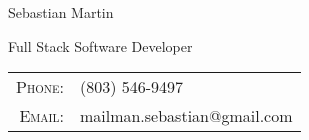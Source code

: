 \documentclass[letterpaper,10pt]{article}
\begin{document}
\pagestyle{empty} %

\par{\centering
{\fontsize{40}{0}\selectfont Sebastian Martin}
\par}
    

\begin{center}
    {\fontsize{12}{40}\selectfont \textcolor{HeaderColor}{Full Stack Software Developer}}
\end{center}
\begin{center}
	\begin{tabular}{r|l}
    \textsc{Phone:}     & (803) 546-9497\\
    \textsc{Email:}     & {mailman.sebastian@gmail.com}
\end{tabular}
\end{center}



\end{document}

